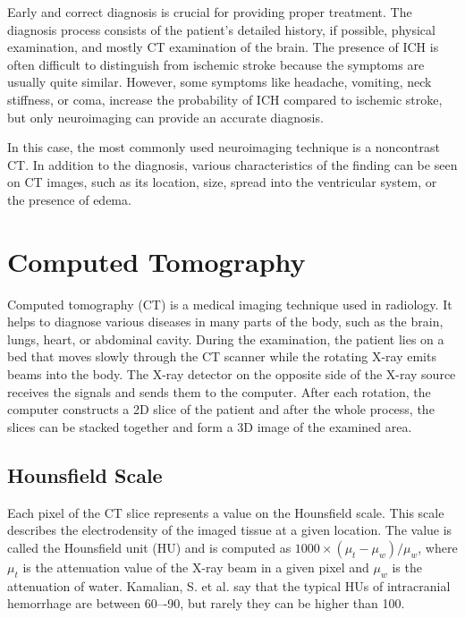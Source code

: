\documentclass[thesis=B,english]{FITthesis}[2019/12/23]
\begin{document}
Early and correct diagnosis is crucial for providing proper treatment. The diagnosis process consists of the patient's detailed history, if possible, physical examination, and mostly CT examination of the brain.\cite{FREEMAN2012211}
The presence of ICH is often difficult to distinguish from ischemic stroke because the symptoms are usually quite similar. However, some symptoms like headache, vomiting, neck stiffness, or coma, increase the probability of ICH compared to ischemic stroke, but only neuroimaging can provide an accurate diagnosis.\cite{CACERES2012771}

In this case, the most commonly used neuroimaging technique is a noncontrast CT. In addition to the diagnosis, various characteristics of the finding can be seen on CT images, such as its location, size, spread into the ventricular system, or the presence of edema.\cite{CACERES2012771}

\section{Computed Tomography}

Computed tomography (CT) is a medical imaging technique used in radiology. It helps to diagnose various diseases in many parts of the body, such as the brain, lungs, heart, or abdominal cavity. During the examination, the patient lies on a bed that moves slowly through the CT scanner while the rotating X-ray emits beams into the body. The X-ray detector on the opposite side of the X-ray source receives the signals and sends them to the computer. After each rotation, the computer constructs a 2D slice of the patient and after the whole process, the slices can be stacked together and form a 3D image of the examined area.\cite{nibib_ct} 

\subsection{Hounsfield Scale}
Each pixel of the CT slice represents a value on the Hounsfield scale.  This scale describes the electrodensity of the imaged tissue at a given location. The value is called the Hounsfield unit (HU) and is computed as $1000\times(\mu_{t} - \mu_{w})/\mu_{w}$, where $\mu_{t}$ is the attenuation value of the X-ray beam in a given pixel and $\mu_{w}$ is the attenuation of water.\cite{LEV2002427} Kamalian, S. et al.\cite{KAMALIAN20163} say that the typical HUs of intracranial hemorrhage are between 60–-90, but rarely they can be higher than 100. 
\end{document}
